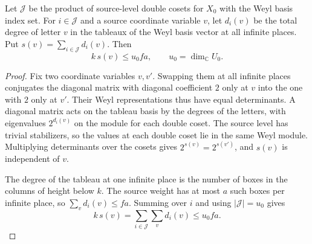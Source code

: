 \begin{lemma}
\label{lem:a-level-mean-degree}
\emitthmsource
Let $\mathcal J$ be the product of source-level double cosets for $X_0$ with the Weyl basis index set. For $i\in\mathcal J$ and a source coordinate variable $v$, let $d_i(v)$ be the total degree of letter $v$ in the tableaux of the Weyl basis vector at all infinite places. Put $s(v)=\sum_{i\in\mathcal J}d_i(v)$. Then
\[
 k\,s(v)\le u_0fa,\qquad u_0=\dim_{\mathbb C}U_0.
\]
\end{lemma}
\begin{proof}
Fix two coordinate variables $v,v'$. Swapping them at all infinite places conjugates the diagonal matrix with diagonal coefficient $2$ only at $v$ into the one with $2$ only at $v'$. Their Weyl representations thus have equal determinants. A diagonal matrix acts on the tableau basis by the degrees of the letters, with eigenvalues $2^{d_i(v)}$ on the module for each double coset. The source level has trivial stabilizers, so the values at each double coset lie in the same Weyl module. Multiplying determinants over the cosets gives $2^{s(v)}=2^{s(v')}$, and $s(v)$ is independent of $v$.

The degree of the tableau at one infinite place is the number of boxes in the columns of height below $k$. The source weight has at most $a$ such boxes per infinite place, so $\sum_v d_i(v)\le fa$. Summing over $i$ and using $|\mathcal J|=u_0$ gives
\[
 k\,s(v)=\sum_{i\in\mathcal J}\sum_v d_i(v)\le u_0fa .
\]
\end{proof}

